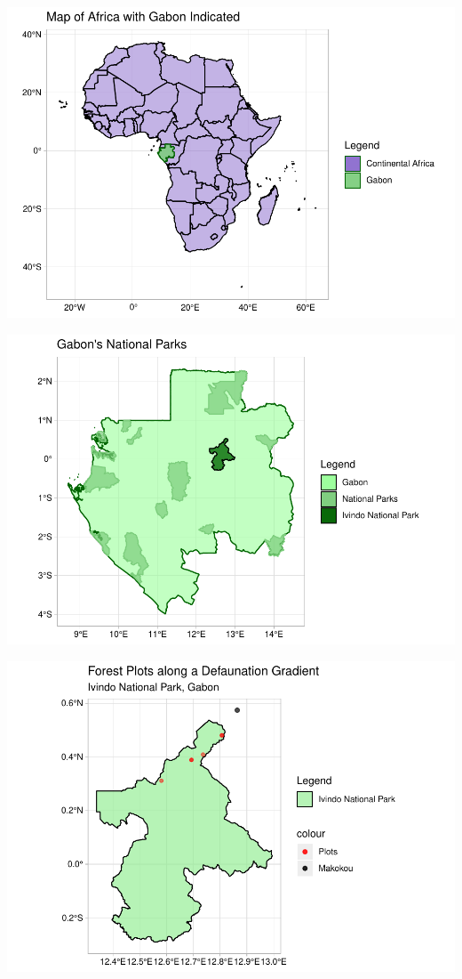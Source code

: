 \documentclass[
  12pt,
]{article}
\begin{document}
\includegraphics{GoldenGriffithsKnierMalinowski_ENV872_Project_files/figure-latex/Map of Gabon-1.pdf}

\includegraphics{GoldenGriffithsKnierMalinowski_ENV872_Project_files/figure-latex/Detailed Map of Gabon with parks-1.pdf}

\includegraphics{GoldenGriffithsKnierMalinowski_ENV872_Project_files/figure-latex/Map of Ivindo with plots-1.pdf}
\end{document}
